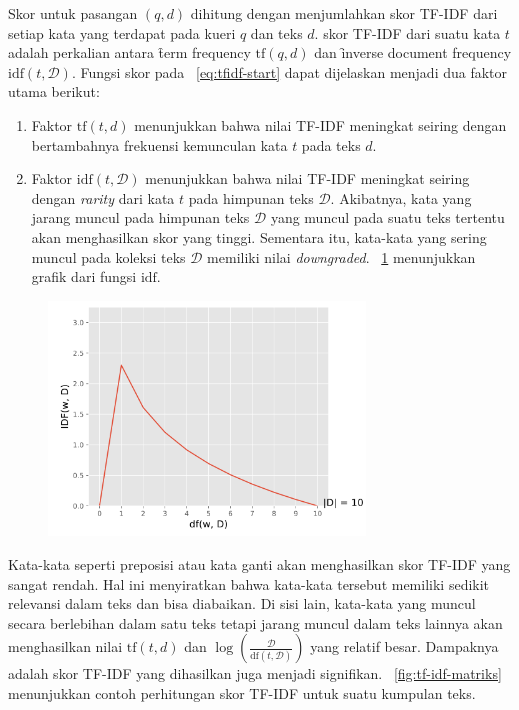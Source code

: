     Skor untuk pasangan $(q,d)$ dihitung dengan menjumlahkan skor TF-IDF dari setiap kata yang terdapat pada kueri $q$ dan teks $d$. skor TF-IDF dari suatu kata $t$ adalah perkalian antara \f{term frequency} $\text{tf}(q,d)$ dan \f{inverse document frequency} $\text{idf}(t,\mathcal{D})$. Fungsi skor pada \equ~\ref{eq:tfidf-start} dapat dijelaskan menjadi dua faktor utama berikut:
    \begin{enumerate}
        \item Faktor $\text{tf}(t, d)$ menunjukkan bahwa nilai TF-IDF meningkat seiring dengan bertambahnya frekuensi kemunculan kata $t$ pada teks $d$.
        \item Faktor $\text{idf}(t, \mathcal{D})$ menunjukkan bahwa nilai TF-IDF meningkat seiring dengan \textit{rarity} dari kata $t$ pada himpunan teks $\mathcal{D}$. Akibatnya, kata yang jarang muncul pada himpunan teks $\mathcal{D}$ yang muncul pada suatu teks tertentu akan menghasilkan skor yang tinggi. Sementara itu, kata-kata yang sering muncul pada koleksi teks $\mathcal{D}$ memiliki nilai \textit{downgraded}. \pic~\ref{fig:idf-graph} menunjukkan grafik dari fungsi $\text{idf}$.
    \end{enumerate}
    \begin{figure}
    \centering
    \includegraphics[width=0.75\textwidth]{assets/pics/idf-graph.png}
        \label{fig:idf-graph}
    \end{figure}

    Kata-kata seperti preposisi atau kata ganti akan menghasilkan skor TF-IDF yang sangat rendah. Hal ini menyiratkan bahwa kata-kata tersebut memiliki sedikit relevansi dalam teks dan bisa diabaikan. Di sisi lain, kata-kata yang muncul secara berlebihan dalam satu teks tetapi jarang muncul dalam teks lainnya akan menghasilkan nilai $\text{tf}(t, d)$ dan $\log \left(\frac{\mathcal{D}}{\text{df}(t, \mathcal{D})}\right)$ yang relatif besar. Dampaknya adalah skor TF-IDF yang dihasilkan juga menjadi signifikan. \pic~\ref{fig:tf-idf-matriks} menunjukkan contoh perhitungan skor TF-IDF untuk suatu kumpulan teks.

